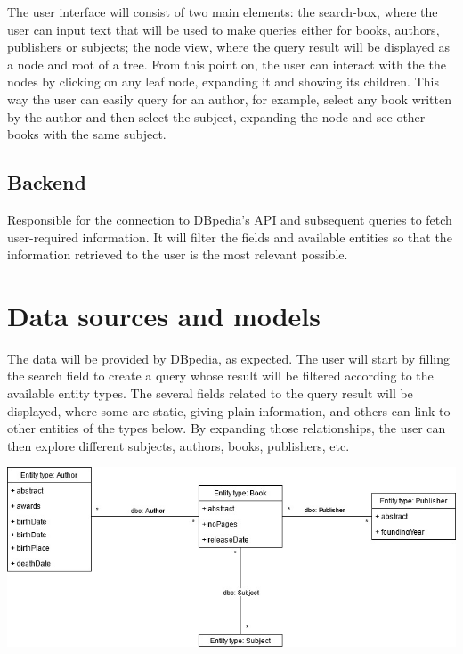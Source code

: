 \documentclass[twocolumn,twoside,11pt,a4paper]{article}
\begin{document}
The user interface will consist of two main elements: the search-box, where the user can input text that will be used to make queries either for books, authors, publishers or subjects; the node view, where the query result will be displayed as a node and root of a tree. From this point on, the user can interact  with the the nodes by clicking on any leaf node, expanding it and showing its children. This way the user can easily query for an author, for example, select any book written by the author and then select the subject, expanding the node and see other books with the same subject.

\subsection{Backend} \label{backend} 

Responsible for the connection to DBpedia’s API and subsequent queries to fetch user-required information. It will filter the fields and available entities so that the information retrieved to the user is the most relevant possible.


\section{Data sources and models}\label{sec:data}

The data will be provided by DBpedia, as expected. The user will start by filling the search field to create a query whose result will be filtered according to the available entity types. The several fields related to the query result will be displayed, where some are static, giving plain information, and others can link to other entities of the types below. By expanding those relationships, the user can then explore different subjects, authors, books, publishers, etc.

\begin{dataFigure}
    \centering\includegraphics[width=1.0\linewidth]{dataModel.jpg}
\end{dataFigure}
\end{document}
